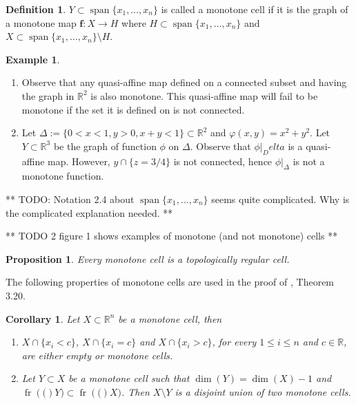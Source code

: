 \documentclass[
]{book}
\providecommand{\tightlist}{%
  \setlength{\itemsep}{0pt}\setlength{\parskip}{0pt}}
\newtheorem{corollary}{Corollary}[chapter]
\newtheorem{proposition}{Proposition}[chapter]
\theoremstyle{definition}
\newtheorem{definition}{Definition}[chapter]
\theoremstyle{definition}
\newtheorem{example}{Example}[chapter]
\theoremstyle{definition}
\theoremstyle{definition}
\theoremstyle{remark}
\begin{document}
\begin{definition}
\protect\hypertarget{def:monotone-cell}{}\label{def:monotone-cell}\citep[Definition 2.5]{bgv15}
\(Y \subset {\operatorname{span} \{x_1,\ldots,x_n\}}\) is called a monotone cell if it is the graph of a monotone map \(\mathbf{f} : X \to H\) where \(H \subset {\operatorname{span} \{x_1,\ldots,x_n\}}\) and \(X \subset {\operatorname{span} \{x_1,\ldots,x_n\}} \setminus H\).
\end{definition}

\begin{example}
\leavevmode

\begin{enumerate}
\def\labelenumi{\arabic{enumi}.}
\item
  Observe that any quasi-affine map defined on a connected subset and having the graph in \(\mathbb{R}^2\) is also monotone. This quasi-affine map will fail to be monotone if the set it is defined on is not connected.
\item
  Let \(\Delta := \{ 0 < x < 1, y > 0, x + y < 1 \} \subset \mathbb{R}^2\) and \(\varphi(x,y) = x^2 + y^2\). Let \(Y \subset \mathbb{R}^3\) be the graph of function \(\phi\) on \(\Delta\). Observe that \(\phi\vert_Delta\) is a quasi-affine map. However, \(y \cap \{ z = 3/4 \}\) is not connected, hence \(\phi\vert_\Delta\) is not a monotone function.
\end{enumerate}

\end{example}

** TODO: Notation 2.4 about \({\operatorname{span} \{x_1,\ldots,x_n\}}\) seems quite complicated. Why is the complicated explanation needed. **

** TODO 2 figure 1 shows examples of monotone (and not monotone) cells **

\begin{proposition}
\protect\hypertarget{prp:monotone-topologically-regular}{}\label{prp:monotone-topologically-regular}\citep[Theorem 1]{bgv13}
Every monotone cell is a topologically regular cell.
\end{proposition}

The following properties of monotone cells are used in the proof of \citet{bgv15}, Theorem 3.20.

\begin{corollary}

\citep[Corollary 7, Theorem 11]{bgv13}
Let \(X \subset \mathbb{R}^n\) be a monotone cell, then

\begin{enumerate}
\def\labelenumi{\arabic{enumi}.}
\tightlist
\item
  \(X \cap \{ x_i < c \}\), \(X \cap \{ x_i = c \}\) and \(X \cap \{ x_i > c \}\), for every \(1 \le i \le n\) and \(c \in \mathbb{R}\), are either empty or monotone cells.
\item
  Let \(Y \subset X\) be a monotone cell such that \(\dim(Y) = \dim(X) - 1\) and \({\operatorname{fr} \left( ( \right)}Y) \subset {\operatorname{fr} \left( ( \right)}X)\). Then \(X \setminus Y\) is a disjoint union of two monotone cells.
\end{enumerate}

\end{corollary}
\end{document}
